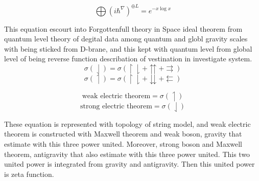 \documentclass{jsarticle}
\begin{document}
	   $$ \bigoplus{(i \hbar^{\nabla})}^{\oplus L} = e^{-x \log x} $$

	      This equation escourt into Forgottenfull theory in Space ideal
	   theorem from quantum level theory of degital data among 
	   quantum and globl gravity scales with being sticked from
	   D-brane, and this kept with quantum level from global level
	   of being reverse function describation of vestination in
	   investigate system.
           $$ \sigma(\downharpoonleft) = \sigma(\upharpoonright 
	   \downharpoonright + \upuparrows 
	   + \rightrightarrows)$$
	   $$ \sigma(\upharpoonleft) =  \sigma(\upharpoonright 
	   \downharpoonright + \downdownarrows 
	   + \leftleftarrows) $$
         
	   $$ \text{weak electric theorem} = \sigma(\upharpoonleft) $$
	   $$ \text{strong electric theorem} = \sigma(\downharpoonleft) $$


	   These equation is represented with topology of string model,
	   and weak electric theorem is constructed with Maxwell theorem 
	   and weak boson, gravity that estimate with this three power united.
	   Moreover, strong boson and Maxwell theorem, antigravity that
	   also estimate with this three power united.
	   This two united power is integrated from gravity and antigravity.
	   Then this united power is zeta function.

   
\end{document}

